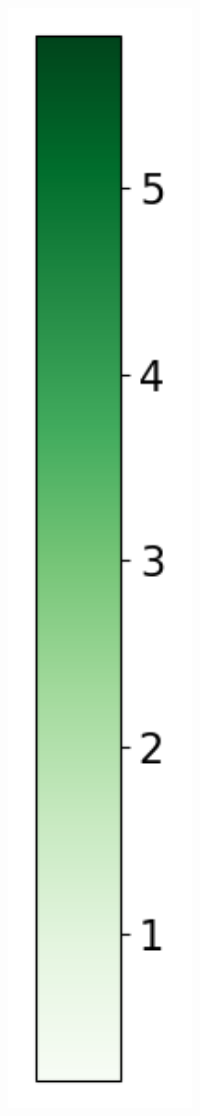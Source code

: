 \begin{figure}
\begin{subfigure}[b]{0.075\textwidth}
        \includegraphics[width=1\textwidth]{Results/kd-laplace/kd-Laplace/circle-dataset/heatmap_legend_distance.png}
    \end{subfigure}
\end{figure}
